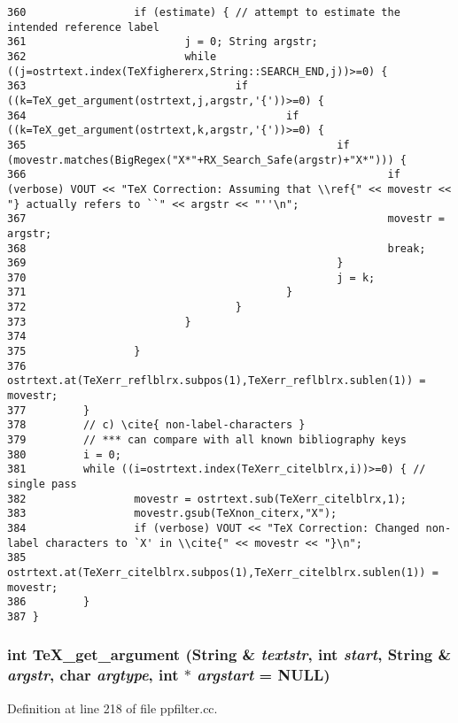 \begin{verbatim}
360                 if (estimate) { // attempt to estimate the intended reference label
361                         j = 0; String argstr;
362                         while ((j=ostrtext.index(TeXfighererx,String::SEARCH_END,j))>=0) {
363                                 if ((k=TeX_get_argument(ostrtext,j,argstr,'{'))>=0) {
364                                         if ((k=TeX_get_argument(ostrtext,k,argstr,'{'))>=0) {
365                                                 if (movestr.matches(BigRegex("X*"+RX_Search_Safe(argstr)+"X*"))) {
366                                                         if (verbose) VOUT << "TeX Correction: Assuming that \\ref{" << movestr << "} actually refers to ``" << argstr << "''\n";
367                                                         movestr = argstr;
368                                                         break;
369                                                 }
370                                                 j = k;
371                                         }
372                                 }
373                         }
374                         
375                 }
376                 ostrtext.at(TeXerr_reflblrx.subpos(1),TeXerr_reflblrx.sublen(1)) = movestr;
377         }
378         // c) \cite{ non-label-characters }
379         // *** can compare with all known bibliography keys
380         i = 0;
381         while ((i=ostrtext.index(TeXerr_citelblrx,i))>=0) { // single pass
382                 movestr = ostrtext.sub(TeXerr_citelblrx,1);
383                 movestr.gsub(TeXnon_citerx,"X");
384                 if (verbose) VOUT << "TeX Correction: Changed non-label characters to `X' in \\cite{" << movestr << "}\n";
385                 ostrtext.at(TeXerr_citelblrx.subpos(1),TeXerr_citelblrx.sublen(1)) = movestr;
386         }
387 }
\end{verbatim}\normalsize 
{}
\subsubsection{\setlength{\rightskip}{0pt plus 5cm}int Te\-X\_\-get\_\-argument ({\bf String} \& {\em textstr}, int {\em start}, {\bf String} \& {\em argstr}, char {\em argtype}, int $\ast$ {\em argstart} = NULL)}\label{dil2al_8hh_a351}




Definition at line 218 of file ppfilter.cc.

